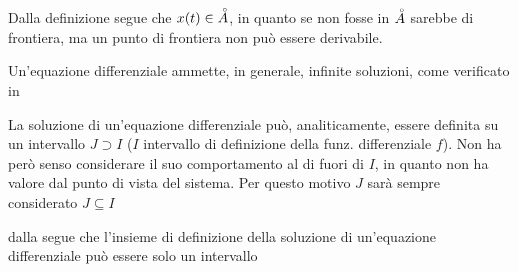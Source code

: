 \begin{definition}
	\begin{note} \hypertarget{def:equaz_diff_sol}{}
		Dalla definizione segue che $x(t) \in \accentset{\circ}{A}$, in quanto se non fosse in $\accentset{\circ}{A}$ sarebbe di frontiera, ma un punto di frontiera non può essere derivabile.
	\end{note}
	\begin{note}
		Un'equazione differenziale ammette, in generale, infinite soluzioni, come verificato in 
	\end{note}
	\begin{note} \hypertarget{note:diff_eq_sol_definit_set}{}
		La soluzione di un'equazione differenziale può, analiticamente, essere definita su un intervallo $J\supset I$ ($I$ intervallo di definizione della funz. differenziale $f$). Non ha però senso considerare il suo comportamento al di fuori di $I$, in quanto non ha valore dal punto di vista del sistema. Per questo motivo $J$ sarà sempre considerato $J\subseteq I$
	\end{note}
	\begin{note}
		dalla  segue che l'insieme di definizione della soluzione di un'equazione differenziale può essere solo un intervallo
	\end{note}
\end{definition}

